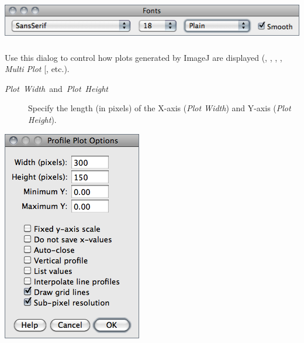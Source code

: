 \noindent \begin{center}
\includegraphics[scale=0.55]{images/Fonts}
\par\end{center}


\subsubsection[\protect\userinterface{Profile Plot Options\ldots{}}]{\protect{}\label{sub:Profile-Plot-Options...}}

Use this dialog to control how plots generated by ImageJ
are displayed (,
,
, ,
\emph{Multi Plot} {[}\userinterface{Analyze\lyxarrow{}Tools\lyxarrow{}\nameref{sub:ROI-Manager...}}{]},
etc.).
\begin{description}
\item [{\emph{Plot}\ \emph{Width}\ and\ \emph{Plot}\ \emph{Height}}] Specify
the length (in pixels) of the X-axis (\emph{Plot Width}) and Y-axis
(\emph{Plot Height}).
\end{description}
\begin{minipage}[c][1\totalheight][t]{0.335\columnwidth}%
\includegraphics[scale=0.55]{images/ProfilePlotOptions}%
\end{minipage}%
